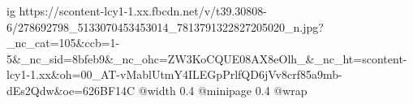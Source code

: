  
 
 
 
 

\ifcmt
  ig https://scontent-lcy1-1.xx.fbcdn.net/v/t39.30808-6/278692798_5133070453453014_7813791322827205020_n.jpg?_nc_cat=105&ccb=1-5&_nc_sid=8bfeb9&_nc_ohc=ZW3KoCQUE08AX8eOlh_&_nc_ht=scontent-lcy1-1.xx&oh=00_AT-vMablUtmY4ILEGpPrlfQD6jVv8crf85a9mb-dEs2Qdw&oe=626BF14C
  @width 0.4
  @minipage 0.4
  @wrap \parpic[r]
\fi
